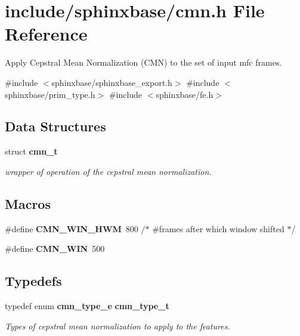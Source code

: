 \section{include/sphinxbase/cmn.h File Reference}
\label{cmn_8h}


Apply Cepstral Mean Normalization (C\+MN) to the set of input mfc frames.  


{\ttfamily \#include $<$sphinxbase/sphinxbase\+\_\+export.\+h$>$}\newline
{\ttfamily \#include $<$sphinxbase/prim\+\_\+type.\+h$>$}\newline
{\ttfamily \#include $<$sphinxbase/fe.\+h$>$}\newline
\subsection*{Data Structures}
\begin{DoxyCompactItemize}
\item 
struct \textbf{ cmn\+\_\+t}
\begin{DoxyCompactList}\small\item\em wrapper of operation of the cepstral mean normalization. \end{DoxyCompactList}\end{DoxyCompactItemize}
\subsection*{Macros}
\begin{DoxyCompactItemize}
\item 
\mbox{\label{cmn_8h_abbf37b74032c295136b4b299ecfcedae}} 
\#define {\bfseries C\+M\+N\+\_\+\+W\+I\+N\+\_\+\+H\+WM}~800     /$\ast$ \#frames after which window shifted $\ast$/
\item 
\mbox{\label{cmn_8h_a500dafed8351d334da9290ec4f3f6ab3}} 
\#define {\bfseries C\+M\+N\+\_\+\+W\+IN}~500
\end{DoxyCompactItemize}
\subsection*{Typedefs}
\begin{DoxyCompactItemize}
\item 
\mbox{\label{cmn_8h_a9384c411b10e9db9745cfb550a5c7652}} 
typedef enum \textbf{ cmn\+\_\+type\+\_\+e} \textbf{ cmn\+\_\+type\+\_\+t}
\begin{DoxyCompactList}\small\item\em Types of cepstral mean normalization to apply to the features. \end{DoxyCompactList}\end{DoxyCompactItemize}
